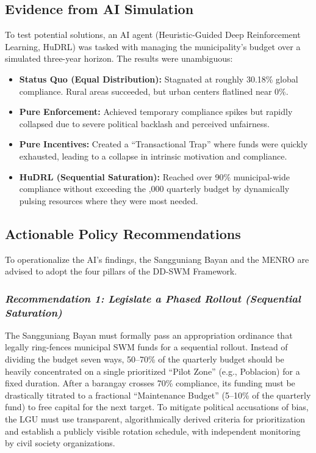 \subsection*{Evidence from AI Simulation}
To test potential solutions, an AI agent (Heuristic-Guided Deep Reinforcement Learning, HuDRL) was tasked with managing the municipality’s budget over a simulated three-year horizon. The results were unambiguous:

\begin{itemize}
    \item \textbf{Status Quo (Equal Distribution):} Stagnated at roughly 30.18\% global compliance. Rural areas succeeded, but urban centers flatlined near 0\%.
    \item \textbf{Pure Enforcement:} Achieved temporary compliance spikes but rapidly collapsed due to severe political backlash and perceived unfairness.
    \item \textbf{Pure Incentives:} Created a “Transactional Trap” where funds were quickly exhausted, leading to a collapse in intrinsic motivation and compliance.
    \item \textbf{HuDRL (Sequential Saturation):} Reached over 90\% municipal-wide compliance without exceeding the ,000 quarterly budget by dynamically pulsing resources where they were most needed.
\end{itemize}

\subsection*{Actionable Policy Recommendations}
To operationalize the AI’s findings, the Sangguniang Bayan and the MENRO are advised to adopt the four pillars of the DD-SWM Framework.

\subsubsection*{\textit{Recommendation 1: Legislate a Phased Rollout (Sequential Saturation)}}
The Sangguniang Bayan must formally pass an appropriation ordinance that legally ring-fences municipal SWM funds for a sequential rollout. Instead of dividing the budget seven ways, 50–70\% of the quarterly budget should be heavily concentrated on a single prioritized “Pilot Zone” (e.g., Poblacion) for a fixed duration. After a barangay crosses 70\% compliance, its funding must be drastically titrated to a fractional “Maintenance Budget” (5–10\% of the quarterly fund) to free capital for the next target. To mitigate political accusations of bias, the LGU must use transparent, algorithmically derived criteria for prioritization and establish a publicly visible rotation schedule, with independent monitoring by civil society organizations.

